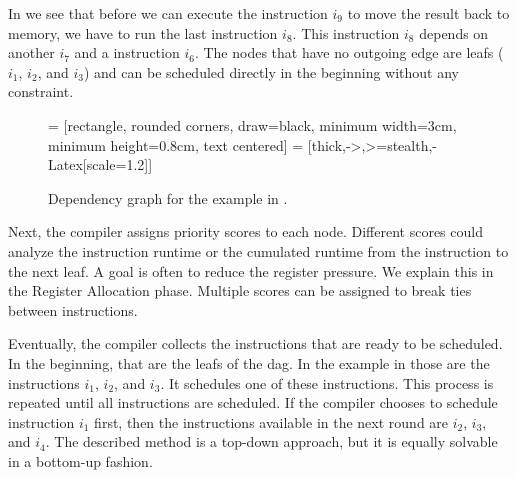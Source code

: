 In  we see that before we can execute the  instruction $i_9$ to move the result back to memory, we have to run the last  instruction $i_8$.
This  instruction $i_8$ depends on another  $i_7$ and a  instruction $i_6$.
The nodes that have no outgoing edge are leafs ($i_1$, $i_2$, and $i_3$) and can be scheduled directly in the beginning without any constraint.
\begin{figure}
    \centering
     = [rectangle, rounded corners, draw=black, minimum width=3cm, minimum height=0.8cm, text centered]
     = [thick,->,>=stealth,-{Latex[scale=1.2]}]
    \caption[Dependency Graph]{Dependency graph for the example in .}
    \label{fig:bg:example-dag}
\end{figure}

Next, the compiler assigns priority scores to each node.
Different scores could analyze the instruction runtime or the cumulated runtime from the instruction to the next leaf.
A goal is often to reduce the register pressure. 
We explain this in the Register Allocation phase.
Multiple scores can be assigned to break ties between instructions.

Eventually, the compiler collects the instructions that are ready to be scheduled.
In the beginning, that are the leafs of the \ac{dag}.
In the example in  those are the instructions $i_1$, $i_2$, and $i_3$.
It schedules one of these instructions.
This process is repeated until all instructions are scheduled.
If the compiler chooses to schedule instruction $i_1$ first, then the instructions available in the next round are $i_2$, $i_3$, and $i_4$.
The described method is a top-down approach, but it is equally solvable in a bottom-up fashion.


